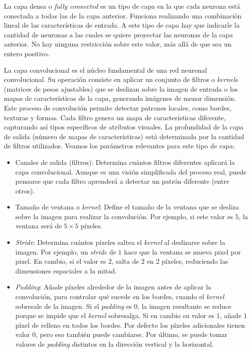 
La capa densa o \emph{fully connected} es un tipo de capa en la que cada neurona está conectada a todas las de la capa anterior. Funciona realizando una combinación lineal de las características de entrada. A este tipo de capa hay que indicarle la cantidad de neuronas a las cuales se quiere proyectar las neuronas de la capa anterior. No hay ninguna restricción sobre este valor, más allá de que sea un entero positivo.


La capa convolucional es el núcleo fundamental de una red neuronal convolucional. Su operación consiste en aplicar un conjunto de filtros o \emph{kernels} (matrices de pesos ajustables) que se deslizan sobre la imagen de entrada o los mapas de características de la capa, generando imágenes de menor dimensión. Este proceso de convolución permite detectar patrones locales, como bordes, texturas y formas. Cada filtro genera un mapa de características diferente, capturando así tipos específicos de atributos visuales. La profundidad de la capa de salida (número de mapas de características) está determinada por la cantidad de filtros utilizados. Veamos los parámetros relevantes para este tipo de capa:
\begin{itemize}
    \item Canales de salida (filtros): Determina cuántos filtros diferentes aplicará la capa convolucional. Aunque es una visión simplificada del proceso real, puede pensarse que cada filtro aprenderá a detectar un patrón diferente (entre otros).
    
    \item Tamaño de ventana o \emph{kernel}: Define el tamaño de la ventana que se desliza sobre la imagen para realizar la convolución. Por ejemplo, si este valor es $5$, la ventana será de $5\times 5$ píxeles.
    
    \item \emph{Stride}: Determina cuántos píxeles saltea el \emph{kernel} al deslizarse sobre la imagen. Por ejemplo, un \emph{stride} de $1$ hace que la ventana se mueva pixel por pixel. En cambio, si el valor es $2$, salta de 2 en 2 píxeles, reduciendo las dimensiones espaciales a la mitad.
    
    \item \emph{Padding}: Añade píxeles alrededor de la imagen antes de aplicar la convolución, para controlar qué sucede en los bordes, cuando el \emph{kernel} sobresale de la imagen. Si el \emph{padding} es $0$, la imagen resultante se reduce porque se impide que el \emph{kernel} sobresalga. Si en cambio su valor es $1$, añade $1$ píxel de relleno en todos los bordes. Por defecto los píxeles adicionales tienen valor $0$, pero eso también puede cambiarse. Por último, se puede tomar valores de \emph{padding} distintos en la dirección vertical y la horizontal.
\end{itemize}

